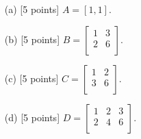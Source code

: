 \begin{enumerate}
    \item[(a)] [5 points]  $A= [1 , 1]$.
    \item[(b)]{[5 points] $ B=
    	 \begin{bmatrix}
        1 & 3 \\
        2 & 6 \\
         
        \end{bmatrix}. $
    }
    \item[(c)]{[5 points] $C= 
         \begin{bmatrix}
        1 & 2 \\
        3 & 6 \\
         
        \end{bmatrix}.$
    }
    \item[(d)]{[5 points] 
        $D= \begin{bmatrix}
        1 & 2 & 3\\
        2 & 4 & 6\\
        \end{bmatrix}.$
    }
\end{enumerate}


